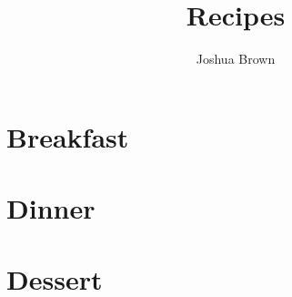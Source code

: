 \documentclass[oneside,10pt]{book}
\title{\bf \Huge Recipes}
\author{Joshua Brown}
\date{}
\begin{document}
\maketitle
\tableofcontents{}

\chapter{Breakfast}
    
    
    

\chapter{Dinner}
    
    
    
    
    
    

\chapter{Dessert}
    
    
\end{document}
